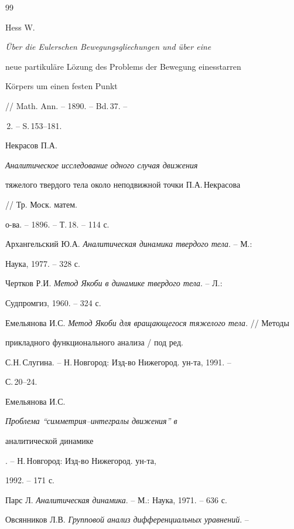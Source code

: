 \begin{thebibliography}{99}







Hess W. {\em \"Uber die Eulerschen Bewegungsgliechungen und \"uber eine


neue partikul\"are L\"ozung des Problems der Bewegung einesstarren


K\"orpers um einen festen Punkt} // Math. Ann. -- 1890. -- Bd.\,37. --


\No\,2. -- S.\,153--181.




Некрасов П.А. {\em Аналитическое исследование одного случая движения


тяжелого твердого тела около неподвижной точки П.А.\,Некрасова}


// Тр. Моск. матем.


о-ва. -- 1896. -- Т.\,18. -- 114 с.




Архангельский Ю.А. {\em Аналитическая динамика твердого тела}. -- М.:


Наука, 1977. -- 328 с.




Чертков Р.И. {\em Метод Якоби в динамике твердого тела}. -- Л.:


Судпромгиз, 1960. -- 324 с.




Емельянова И.С. {\em Метод Якоби для вращающегося тяжелого тела}. // Методы


прикладного функционального анализа / под ред.


С.Н.\,Слугина. -- Н.\,Новгород: Изд-во Нижегород. ун-та, 1991. --


С.\,20--24.




Емельянова И.С. {\em Проблема ``симметрия--интегралы движения'' в


аналитической динамике}. -- Н.\,Новгород: Изд-во Нижегород. ун-та,


1992. -- 171 с.




Парс Л. {\em Аналитическая динамика}. -- М.: Наука, 1971. -- 636 с.




Овсянников Л.В. {\em Групповой анализ дифференциальных уравнений}. --



\end{thebibliography}
